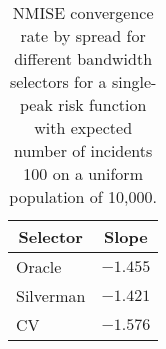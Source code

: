 \begin{table}[htbp]
\begin{center}
\begin{tabular}{lr}
\toprule
\multicolumn{1}{c}{Selector}&\multicolumn{1}{c}{Slope}\tabularnewline
\midrule
Oracle&$-1.455$\tabularnewline
Silverman&$-1.421$\tabularnewline
CV&$-1.576$\tabularnewline
\bottomrule
\end{tabular}
\caption[NMISE Convergence rate by spread for 100 cases]{NMISE convergence rate by spread for different bandwidth selectors for a single-peak risk function with expected number of incidents 100 on a uniform population of 10,000.\label{tab:results:nmise_convergence_by_cases_spread}}\end{center}
\end{table}
